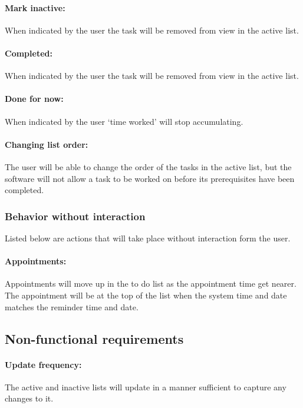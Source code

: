 \documentclass[12pt,a4paper]{article}
\begin{document}
\paragraph{Mark inactive:} When indicated by the user the task will be removed from view in the active list.
\paragraph{Completed:} When indicated by the user the task will be removed from view in the active list.
\paragraph{Done for now:} When indicated by the user `time worked' will stop accumulating.
\paragraph{Changing list order:} The user will be able to change the order of the tasks in the active list, but the software will not allow a task to be worked on before its prerequisites have been completed. 

\subsubsection{Behavior without interaction}
Listed below are actions that will take place without interaction form the user.
\paragraph{Appointments:} Appointments will move up in the to do list as the appointment time get nearer.  The appointment will be at the top of the list when the system time and date matches the reminder time and date.

\subsection{Non-functional requirements}
\setcounter{paragraph}{0}

\paragraph{Update frequency:} The active and inactive lists will update in a manner sufficient to capture any changes to it.
\end{document}
